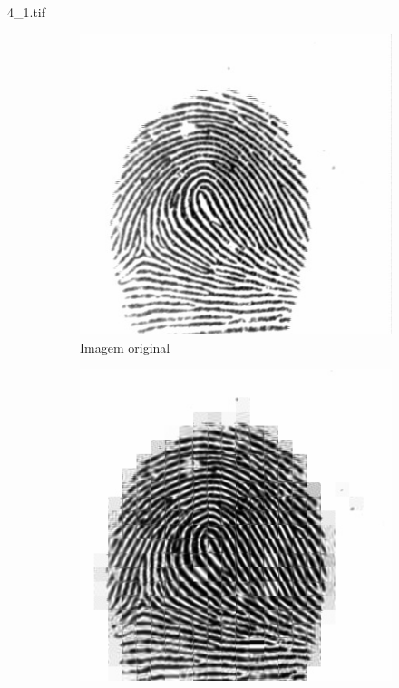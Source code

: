 \documentclass{beamer}
\begin{document}
    \begin{frame}{4\_1.tif}
        \begin{figure}
            \centering
            \begin{subfigure}[!ht]{0.32\textwidth}
                \includegraphics[width=\columnwidth]{Fingerprints/4_1.jpg}
                \caption{Imagem original}
            \end{subfigure}
            \begin{subfigure}[!ht]{0.32\textwidth}
                \includegraphics[width=\columnwidth]{Fingerprints/4_1_intermediate.jpg}

\end{subfigure}
\end{figure}
\end{frame}
\end{document}
